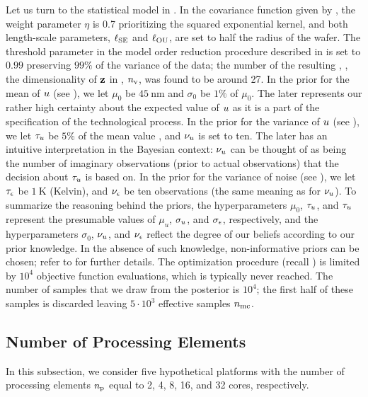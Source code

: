 Let us turn to the statistical model in . In the covariance function given by , the weight parameter $\eta$ is 0.7 prioritizing the squared exponential kernel, and both length-scale parameters, $\ell_{\text{SE}}$ and $\ell_{\text{OU}}$, are set to half the radius of the wafer. The threshold parameter in the model order reduction procedure described in  is set to $0.99$ preserving $99\%$ of the variance of the data; the number of the resulting \rvs, \ie, the dimensionality of $\mathbf{z}$ in , ${n_\text{v}}$, was found to be around 27. In the prior for the mean of $u$ (see ), we let $\mu_0$ be $45~\text{nm}$ and $\sigma_0$ be $1\%$ of $\mu_0$. The later represents our rather high certainty about the expected value of $u$ as it is a part of the specification of the technological process. In the prior for the variance of $u$ (see ), we let $\tau_u$ be $5\%$ of the mean value \cite{juan2011, juan2012}, and $\nu_u$ is set to ten. The later has an intuitive interpretation in the Bayesian context: $\nu_u$ can be thought of as being the number of imaginary observations (prior to actual observations) that the decision about $\tau_u$ is based on. In the prior for the variance of noise (see ), we let $\tau_\epsilon$ be $1~\text{K}$ (Kelvin), and $\nu_\epsilon$ be ten observations (the same meaning as for $\nu_u$). To summarize the reasoning behind the priors, the hyperparameters $\mu_0$, $\tau_u$, and $\tau_u$ represent the presumable values of $\mu_u$, $\sigma_u$, and $\sigma_\epsilon$, respectively, and the hyperparameters $\sigma_0$, $\nu_u$, and $\nu_\epsilon$ reflect the degree of our beliefs according to our prior knowledge. In the absence of such knowledge, non-informative priors can be chosen; refer to \cite{gelman2004} for further details. The optimization procedure (recall ) is limited by $10^4$ objective function evaluations, which is typically never reached. The number of samples that we draw from the posterior is $10^4$; the first half of these samples is discarded leaving $5 \cdot 10^3$ effective samples ${n_\text{mc}}$.

\subsection{Number of Processing Elements}
In this subsection, we consider five hypothetical platforms with the number of processing elements ${n_\text{p}}$ equal to 2, 4, 8, 16, and 32 cores, respectively.

